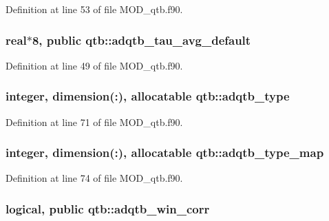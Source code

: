 Definition at line 53 of file M\-O\-D\-\_\-qtb.\-f90.

\hypertarget{classqtb_a1905ac2f72584412e56fc1037a57641e}{
\subsubsection[{adqtb\-\_\-tau\-\_\-avg\-\_\-default}]{\setlength{\rightskip}{0pt plus 5cm}real$\ast$8, public qtb\-::adqtb\-\_\-tau\-\_\-avg\-\_\-default}}\label{classqtb_a1905ac2f72584412e56fc1037a57641e}


Definition at line 49 of file M\-O\-D\-\_\-qtb.\-f90.

\hypertarget{classqtb_aa9083781ffe9503478089cd26645b88d}{
\subsubsection[{adqtb\-\_\-type}]{\setlength{\rightskip}{0pt plus 5cm}integer, dimension(\-:), allocatable qtb\-::adqtb\-\_\-type}}\label{classqtb_aa9083781ffe9503478089cd26645b88d}


Definition at line 71 of file M\-O\-D\-\_\-qtb.\-f90.

\hypertarget{classqtb_a1080eac758b439ed2aeaf49ef5e92f5e}{
\subsubsection[{adqtb\-\_\-type\-\_\-map}]{\setlength{\rightskip}{0pt plus 5cm}integer, dimension(\-:), allocatable qtb\-::adqtb\-\_\-type\-\_\-map}}\label{classqtb_a1080eac758b439ed2aeaf49ef5e92f5e}


Definition at line 74 of file M\-O\-D\-\_\-qtb.\-f90.

\hypertarget{classqtb_a5b41caa8ef3066475460c3190920f295}{
\subsubsection[{adqtb\-\_\-win\-\_\-corr}]{\setlength{\rightskip}{0pt plus 5cm}logical, public qtb\-::adqtb\-\_\-win\-\_\-corr}}\label{classqtb_a5b41caa8ef3066475460c3190920f295}


